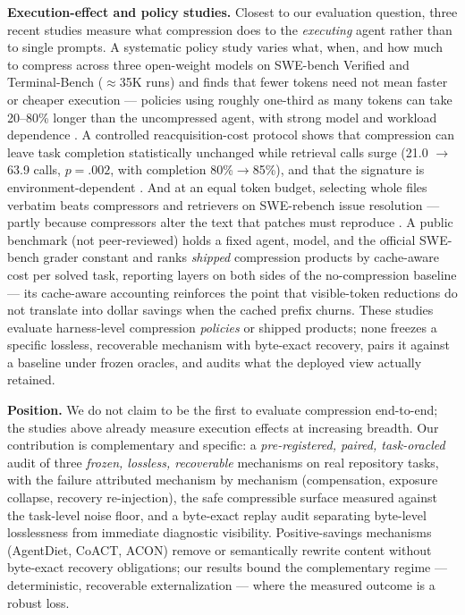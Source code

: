 \documentclass[twocolumn]{svjour3}       %
\begin{document}
\textbf{Execution-effect and policy studies.} Closest to our evaluation question, three
recent studies measure what compression does to the \emph{executing} agent rather than to
single prompts. A systematic policy study varies what, when, and how much to compress
across three open-weight models on SWE-bench Verified and Terminal-Bench ($\approx$35K
runs) and finds that fewer tokens need not mean faster or cheaper execution ---
policies using roughly one-third as many tokens can take 20--80\% longer than the
uncompressed agent, with strong model and workload dependence
\cite{beyondtokensavings2026}. A controlled reacquisition-cost protocol shows that
compression can leave task completion statistically unchanged while retrieval calls
surge (21.0 $\rightarrow$ 63.9 calls, $p{=}.002$, with completion 80\%$\rightarrow$85\%),
and that the signature is environment-dependent \cite{compressioncost2026}. And at an
equal token budget, selecting whole files verbatim beats compressors and retrievers on
SWE-rebench issue resolution --- partly because compressors alter the text that patches
must reproduce \cite{skipcompressor2026}. A public benchmark (not peer-reviewed) holds a
fixed agent, model, and the official SWE-bench grader constant and ranks \emph{shipped}
compression products by cache-aware cost per solved task, reporting layers on both sides
of the no-compression baseline \cite{daseinbench2026} --- its cache-aware accounting
reinforces the point that visible-token reductions do not translate into dollar savings
when the cached prefix churns. These studies evaluate harness-level
compression \emph{policies} or shipped products; none freezes a specific lossless,
recoverable mechanism
with byte-exact recovery, pairs it against a baseline under frozen oracles, and audits
what the deployed view actually retained.

\textbf{Position.} We do not claim to be the first to evaluate compression end-to-end;
the studies above already measure execution effects at increasing breadth. Our
contribution is complementary and specific: a \emph{pre-registered, paired,
task-oracled} audit of three \emph{frozen, lossless, recoverable} mechanisms on real
repository tasks, with the failure attributed mechanism by mechanism (compensation,
exposure collapse, recovery re-injection), the safe compressible surface measured
against the task-level noise floor, and a byte-exact replay audit separating
byte-level losslessness from immediate diagnostic visibility. Positive-savings
mechanisms (AgentDiet, CoACT, ACON) remove or semantically rewrite content without
byte-exact recovery obligations; our results bound the complementary regime ---
deterministic, recoverable externalization --- where the measured outcome is a robust
loss.
\end{document}
